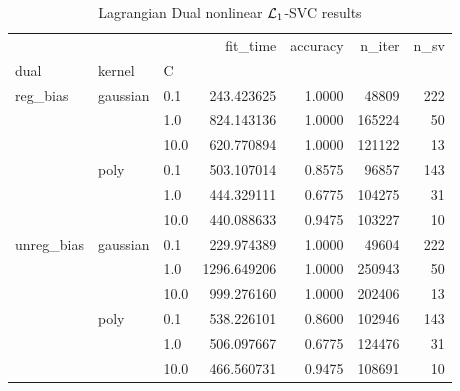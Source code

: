 \begin{table}[H]
\centering
\caption{Lagrangian Dual nonlinear $\protect \mathcal{L}_1$-SVC results}
\label{nonlinear_lagrangian_dual_l1_svc_cv_results}
\begin{tabular}{lllrrrr}
\toprule
           &      &      &     fit\_time &  accuracy &  n\_iter &  n\_sv \\
dual & kernel & C &              &           &         &       \\
\midrule
reg\_bias & gaussian & 0.1  &   243.423625 &    1.0000 &   48809 &   222 \\
           &      & 1.0  &   824.143136 &    1.0000 &  165224 &    50 \\
           &      & 10.0 &   620.770894 &    1.0000 &  121122 &    13 \\
           & poly & 0.1  &   503.107014 &    0.8575 &   96857 &   143 \\
           &      & 1.0  &   444.329111 &    0.6775 &  104275 &    31 \\
           &      & 10.0 &   440.088633 &    0.9475 &  103227 &    10 \\
unreg\_bias & gaussian & 0.1  &   229.974389 &    1.0000 &   49604 &   222 \\
           &      & 1.0  &  1296.649206 &    1.0000 &  250943 &    50 \\
           &      & 10.0 &   999.276160 &    1.0000 &  202406 &    13 \\
           & poly & 0.1  &   538.226101 &    0.8600 &  102946 &   143 \\
           &      & 1.0  &   506.097667 &    0.6775 &  124476 &    31 \\
           &      & 10.0 &   466.560731 &    0.9475 &  108691 &    10 \\
\bottomrule
\end{tabular}
\end{table}
